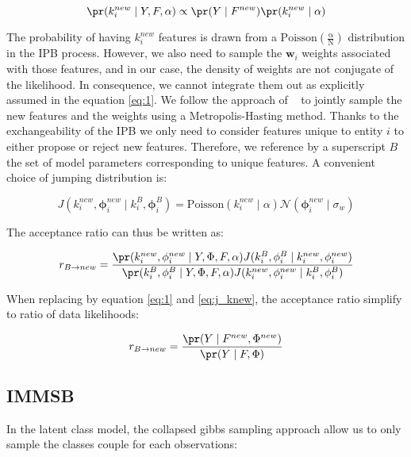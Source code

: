 \begin{equation} \label{eq:1}
\pr(k_i^{new} \mid Y, F, \alpha) \propto \pr(Y \mid F^{new})\pr(k_i^{new} \mid \alpha)
\end{equation}

The probability of having $k_i^{new}$ features is drawn from a $\mathrm{Poisson(\frac{\alpha}{N})}$ distribution in the IPB process. However, we also need to sample the $\mathbf{w}_i$ weights associated with those features, and in our case, the density of weights are not conjugate of the likelihood. In consequence, we cannot integrate them out as explicitly assumed in the equation \eqref{eq:1}. We follow the approach of ~\cite{BMF} to jointly sample the new features and the weights using a Metropolis-Hasting method. Thanks to the  exchangeability of the IPB we only need to consider features unique to entity $i$ to either propose or reject new features. Therefore, we reference by a superscript $B$ the set of model parameters corresponding to unique features. A convenient choice of jumping distribution is:

\begin{equation} \label{eq:j_knew}
J(k_i^{new}, \mathbf{\phi}_i^{new} \mid k_i^B, \mathbf{\phi}_i^B) = \mathrm{Poisson}(k_i^{new} \mid \alpha) \mathcal{N}(\mathbf{\phi}_i^{new} \mid \sigma_w)
\end{equation}

The acceptance ratio can thus be written as:

\begin{equation}
r_{B\rightarrow new} = \frac{\pr(k_i^{new}, \mathbf{\phi}_i^{new} \mid Y, \Phi, F, \alpha) J(k_i^{B}, \mathbf{\phi}_i^{B} \mid k_i^{new}, \mathbf{\phi}_i^{new})}{\pr(k_i^B, \mathbf{\phi}_i^B \mid Y, \Phi, F, \alpha) J(k_i^{new}, \mathbf{\phi}_i^{new} \mid k_i^B, \mathbf{\phi}_i^B)}
\end{equation}

When replacing by equation \eqref{eq:1} and \eqref{eq:j_knew}, the acceptance ratio simplify to ratio of data likelihoods:

\begin{equation} \label{eq:r_knew} 
r_{B\rightarrow new} = \frac{\pr(Y \mid F^{new}, \Phi^{new})}{\pr(Y \mid F, \Phi)}
\end{equation}

\subsection{IMMSB}

In the latent class model, the collapsed gibbs sampling approach allow us to only sample the classes couple for each observations:

